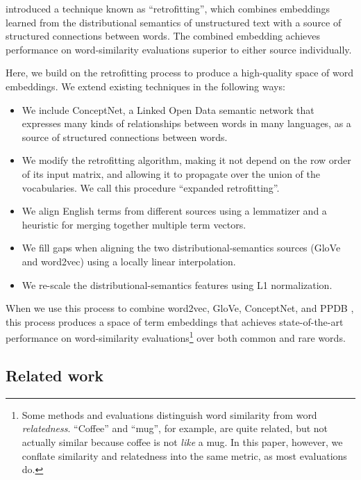 \documentclass[11pt,letterpaper]{article}
\begin{document}
 introduced a technique
known as ``retrofitting'', which combines embeddings learned from the
distributional semantics of unstructured text with a source of structured
connections between words. The combined embedding achieves performance on
word-similarity evaluations superior to either source individually.

Here, we build on the retrofitting process to produce a high-quality space of
word embeddings. We extend existing techniques in the following ways:

\begin{itemize}
\item We include ConceptNet, a Linked Open Data semantic network that expresses
many kinds of relationships between words in many languages, as a source of
structured connections between words.
\item We modify the retrofitting algorithm, making it not depend on the row
order of its input matrix, and allowing it to propagate over the union of the
vocabularies. We call this procedure ``expanded retrofitting''.
\item We align English terms from different sources using a lemmatizer and a
heuristic for merging together multiple term vectors.
\item We fill gaps when aligning the two distributional-semantics sources
(GloVe and word2vec) using a locally linear interpolation.
\item We re-scale the distributional-semantics features using L1 normalization.
\end{itemize}

When we use this process to combine word2vec, GloVe, ConceptNet, and PPDB
\cite{ganitkevitch2013ppdb}, this process produces a space of term embeddings
that achieves state-of-the-art performance on word-similarity
evaluations\footnote{Some methods and evaluations \cite{agirre2009study}
distinguish word similarity from word
{\em relatedness}. ``Coffee'' and ``mug'', for example, are quite related,
but not actually similar because coffee is not {\em like} a mug. In this paper,
however, we conflate similarity and relatedness into the same metric, as most
evaluations do.}
over both common and rare words.


\subsection{Related work}

\end{document}
